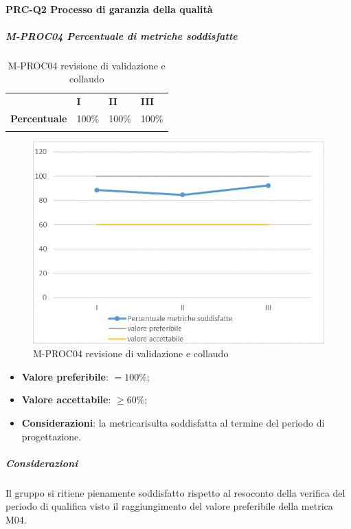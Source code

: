 \paragraph*{PRC-Q2 Processo di garanzia della qualità}
\subparagraph{M-PROC04 Percentuale di metriche soddisfatte} \mbox{}
\begin{longtable}[H!] {						
		>{}p{50mm}  		
		>{}p{8mm}
		>{}p{8mm}		
		>{}p{8mm}		
	}
	\rowcolor{gray!50}
	\textbf{} & \textbf{I} & \textbf{II} & \textbf{III}\TBstrut \\ [2mm]
	\textbf{Percentuale} & 100\% & 100\% & 100\% \TBstrut \\ [2mm]
	\rowcolor{white}
	\caption{M-PROC04 revisione di validazione e collaudo}
\end{longtable}
\begin{figure}[H] 	
	\includegraphics[width=\linewidth]{./img/grafici/RA4.png}	
	\caption{M-PROC04 revisione di validazione e collaudo}	
\end{figure}
\begin{itemize}
	\item \textbf{Valore preferibile}: $=100\%$;
	\item \textbf{Valore accettabile}: $\ge60\%$;
	\item \textbf{Considerazioni}: la metrica\glosp risulta soddisfatta al termine del periodo di progettazione\glo.
\end{itemize}
\subparagraph{Considerazioni}
Il gruppo si ritiene pienamente soddisfatto rispetto al resoconto della verifica del periodo di qualifica visto il raggiungimento del valore preferibile della metrica M04. 


